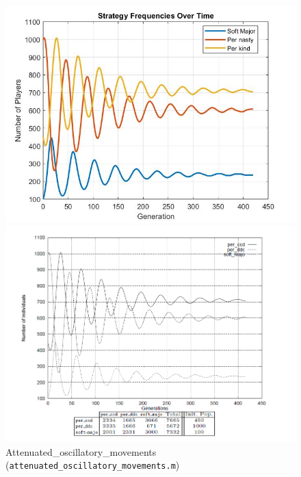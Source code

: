 \begin{figure}[htbp]
	\centering
	\begin{minipage}{0.48\textwidth}
		\centering
		\includegraphics[width=0.8\linewidth]{fit_plots_theoretical/attenuated_oscillatory_movements}
	
	\end{minipage}
	\hfill
	\begin{minipage}{0.48\textwidth}
		\centering
		\includegraphics[width=0.8\linewidth]{attenuated_oscillatory_movements}
	
	\end{minipage}
		\caption{Attenuated\_oscillatory\_movements (\texttt{attenuated\_oscillatory\_movements.m})}

\end{figure}
\clearpage





